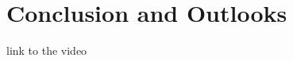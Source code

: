\documentclass[runningheads]{llncs}
\begin{document}
\section{Conclusion and Outlooks}

link to the video

 
%
%
%
% 
% 


 
\end{document}
